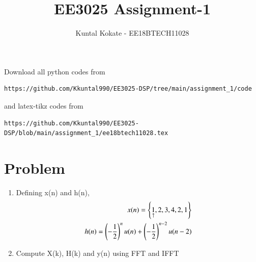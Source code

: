 \documentclass[journal,12pt,twocolumn]{IEEEtran}
\renewcommand\thesection{\arabic{section}}
\begin{document}
     \def\rightbox#1{\makebox[0in][r]{#1}}
     \def\centbox#1{\makebox[0in]{#1}}
     \def\topbox#1{\raisebox{-\baselineskip}[0in][0in]{#1}}
     \def\midbox#1{\raisebox{-0.5\baselineskip}[0in][0in]{#1}}
\vspace{3cm}
\title{EE3025 Assignment-1}
\author{Kuntal Kokate - EE18BTECH11028}
\maketitle
\newpage
\bigskip
\renewcommand{\thefigure}{\theenumi}
\renewcommand{\thetable}{\theenumi}
Download all python codes from 
\begin{lstlisting}
https://github.com/Kkuntal990/EE3025-DSP/tree/main/assignment_1/code
\end{lstlisting}
%
and latex-tikz codes from 
%
\begin{lstlisting}
https://github.com/Kkuntal990/EE3025-DSP/blob/main/assignment_1/ee18btech11028.tex
\end{lstlisting}

\section{Problem}
\begin{enumerate}[label=\thesection.\arabic*.,ref=\thesection.\theenumi]
    
    \item Defining x(n) and h(n),
    \begin{align}
        x(n) = \left\{\underset{\uparrow}{1},2,3,4,2,1\right\} \\
        h(n)=\left(-\frac{1}{2}\right)^{n} u(n)+\left(-\frac{1}{2}\right)^{n-2} u(n-2)
    \end{align}
    
    \item Compute X(k), H(k) and y(n) using FFT and IFFT 

\end{enumerate}
\end{document}
